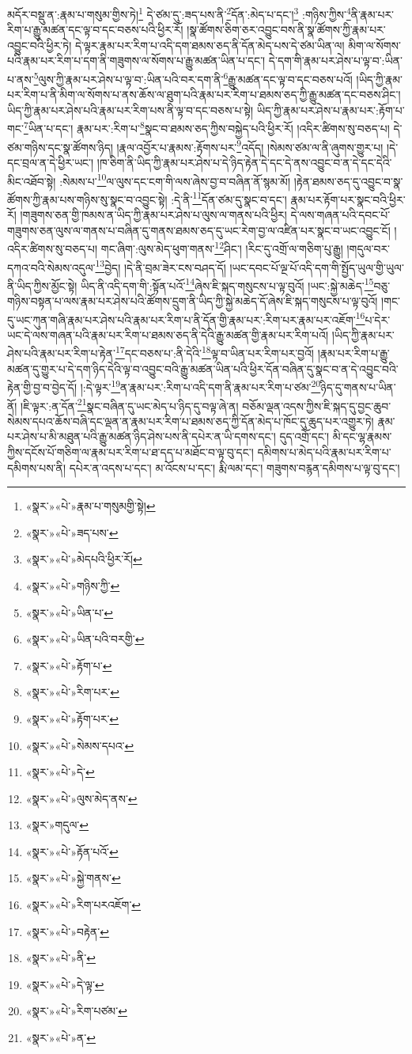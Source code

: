མདོར་བསྡུ་ན་:རྣམ་པ་གསུམ་གྱིས་ཏེ།\footnote{«སྣར་»«པེ་»རྣམ་པ་གསུམགྱི་སྟེ།} དེ་ཙམ་དུ་:ཟད་པས་ནི་\footnote{«སྣར་»«པེ་»ཟད་པས་}དོན་:མེད་པ་དང་།\footnote{«སྣར་»«པེ་»མེདཔའི་ཕྱིར་རོ།} :གཉིས་ཀྱིས་\footnote{«སྣར་»«པེ་»གཉིས་ཀྱི་}ནི་རྣམ་པར་རིག་པ་རྒྱུ་མཚན་དང་ལྟ་བ་དང་བཅས་པའི་ཕྱིར་རོ། །སྣ་ཚོགས་ཅིག་ཅར་འབྱུང་བས་ནི་སྣ་ཚོགས་ཀྱི་རྣམ་པར་འབྱུང་བའི་ཕྱིར་ཏེ། དེ་ལྟར་རྣམ་པར་རིག་པ་འདི་དག་ཐམས་ཅད་ནི་དོན་མེད་པས་དེ་ཙམ་ཡིན་ལ། མིག་ལ་སོགས་པའི་རྣམ་པར་རིག་པ་དག་ནི་གཟུགས་ལ་སོགས་པ་རྒྱུ་མཚན་ཡིན་པ་དང་། དེ་དག་གི་རྣམ་པར་ཤེས་པ་ལྟ་བ་:ཡིན་པ་ནས་\footnote{«སྣར་»«པེ་»ཡིན་པ་}ལུས་ཀྱི་རྣམ་པར་ཤེས་པ་ལྟ་བ་:ཡིན་པའི་བར་དག་ནི་\footnote{«སྣར་»«པེ་»ཡིན་པའི་བརགྱི་}རྒྱུ་མཚན་དང་ལྟ་བ་དང་བཅས་པའོ། །ཡིད་ཀྱི་རྣམ་པར་རིག་པ་ནི་མིག་ལ་སོགས་པ་ནས་ཆོས་ལ་ཐུག་པའི་རྣམ་པར་རིག་པ་ཐམས་ཅད་ཀྱི་རྒྱུ་མཚན་དང་བཅས་ཤིང་། ཡིད་ཀྱི་རྣམ་པར་ཤེས་པའི་རྣམ་པར་རིག་པས་ནི་ལྟ་བ་དང་བཅས་པ་སྟེ། ཡིད་ཀྱི་རྣམ་པར་ཤེས་པ་རྣམ་པར་:རྟོག་པ་གང་\footnote{«སྣར་»«པེ་»རྟོག་པ་}ཡིན་པ་དང་། རྣམ་པར་:རིག་པ་\footnote{«སྣར་»«པེ་»རིག་པར་}སྣང་བ་ཐམས་ཅད་ཀྱིས་བསྐྱེད་པའི་ཕྱིར་རོ། །འདིར་ཚིགས་སུ་བཅད་པ། དེ་ཙམ་གཉིས་དང་སྣ་ཚོགས་ཉིད། །རྣལ་འབྱོར་པ་རྣམས་:རྟོགས་པར་\footnote{«སྣར་»«པེ་»རྟོག་པར་}འདོད། །སེམས་ཙམ་ལ་ནི་ཞུགས་གྱུར་པ། །དེ་དང་བྲལ་ན་དེ་ཕྱིར་ཡང་། །ཁ་ཅིག་ནི་ཡིད་ཀྱི་རྣམ་པར་ཤེས་པ་དེ་ཉིད་རྟེན་དེ་དང་དེ་ནས་འབྱུང་བ་ན་དེ་དང་དེའི་མིང་འཐོབ་སྟེ། :སེམས་པ་\footnote{«སྣར་»«པེ་»སེམས་དཔའ་}ལ་ལུས་དང་ངག་གི་ལས་ཞེས་བྱ་བ་བཞིན་ནོ་སྙམ་མོ། །རྟེན་ཐམས་ཅད་དུ་འབྱུང་བ་སྣ་ཚོགས་ཀྱི་རྣམ་པས་གཉིས་སུ་སྣང་བ་འབྱུང་སྟེ། :དེ་ནི་\footnote{«སྣར་»«པེ་»དེ་}དོན་ཙམ་དུ་སྣང་བ་དང་། རྣམ་པར་རྟོག་པར་སྣང་བའི་ཕྱིར་རོ། །གཟུགས་ཅན་གྱི་ཁམས་ན་ཡིད་ཀྱི་རྣམ་པར་ཤེས་པ་ལུས་ལ་གནས་པའི་ཕྱིར། དེ་ལས་གཞན་པའི་དབང་པོ་གཟུགས་ཅན་ལུས་ལ་གནས་པ་བཞིན་དུ་གནས་ཐམས་ཅད་དུ་ཡང་རེག་བྱ་ལ་འཛིན་པར་སྣང་བ་ཡང་འབྱུང་ངོ། །འདིར་ཚིགས་སུ་བཅད་པ། གང་ཞིག་:ལུས་མེད་ཕུག་གནས་\footnote{«སྣར་»«པེ་»ལུས་མེད་ནས་}ཤིང་། །རིང་དུ་འགྲོ་ལ་གཅིག་པུ་རྒྱུ། །གདུལ་བར་དཀའ་བའི་སེམས་འདུལ་\footnote{«སྣར་»གདུལ་}བྱེད། །དེ་ནི་བྲམ་ཟེར་ངས་བཤད་དོ། །ཡང་དབང་པོ་ལྔ་པོ་འདི་དག་གི་སྤྱོད་ཡུལ་གྱི་ཡུལ་ནི་ཡིད་ཀྱིས་མྱོང་སྟེ། ཡིད་ནི་འདི་དག་གི་:སྟོན་པའོ་\footnote{«སྣར་»«པེ་»རྟོན་པའོ་}ཞེས་ཇི་སྐད་གསུངས་པ་ལྟ་བུའོ། །ཡང་:སྐྱེ་མཆེད་\footnote{«སྣར་»«པེ་»སྐྱེ་གནས་}བཅུ་གཉིས་བསྟན་པ་ལས་རྣམ་པར་ཤེས་པའི་ཚོགས་དྲུག་ནི་ཡིད་ཀྱི་སྐྱེ་མཆེད་དོ་ཞེས་ཇི་སྐད་གསུངས་པ་ལྟ་བུའོ། །གང་དུ་ཡང་ཀུན་གཞི་རྣམ་པར་ཤེས་པའི་རྣམ་པར་རིག་པ་ནི་དོན་གྱི་རྣམ་པར་:རིག་པར་རྣམ་པར་འཇོག་\footnote{«སྣར་»«པེ་»རིག་པརའཇོག་}པ་དེར་ཡང་དེ་ལས་གཞན་པའི་རྣམ་པར་རིག་པ་ཐམས་ཅད་ནི་དེའི་རྒྱུ་མཚན་གྱི་རྣམ་པར་རིག་པའོ། །ཡིད་ཀྱི་རྣམ་པར་ཤེས་པའི་རྣམ་པར་རིག་པ་རྟེན་\footnote{«སྣར་»«པེ་»བརྟེན་}དང་བཅས་པ་:ནི་དེའི་\footnote{«སྣར་»«པེ་»ནི་}ལྟ་བ་ཡིན་པར་རིག་པར་བྱའོ། །རྣམ་པར་རིག་པ་རྒྱུ་མཚན་དུ་གྱུར་པ་དེ་དག་ཉིད་དེའི་ལྟ་བ་འབྱུང་བའི་རྒྱུ་མཚན་ཡིན་པའི་ཕྱིར་དོན་བཞིན་དུ་སྣང་བ་ན་དེ་འབྱུང་བའི་རྟེན་གྱི་བྱ་བ་བྱེད་དོ། །:དེ་ལྟར་\footnote{«སྣར་»«པེ་»དེ་ལྟ་}ན་རྣམ་པར་:རིག་པ་འདི་དག་ནི་རྣམ་པར་རིག་པ་ཙམ་\footnote{«སྣར་»«པེ་»རིག་པཙམ་}ཉིད་དུ་གནས་པ་ཡིན་ནོ། །ཇི་ལྟར་:ན་དོན་\footnote{«སྣར་»«པེ་»ན་}སྣང་བཞིན་དུ་ཡང་མེད་པ་ཉིད་དུ་བལྟ་ཞེ་ན། བཅོམ་ལྡན་འདས་ཀྱིས་ཇི་སྐད་དུ་བྱང་ཆུབ་སེམས་དཔའ་ཆོས་བཞི་དང་ལྡན་ན་རྣམ་པར་རིག་པ་ཐམས་ཅད་ཀྱི་དོན་མེད་པ་ཁོང་དུ་ཆུད་པར་འགྱུར་ཏེ། རྣམ་པར་ཤེས་པ་མི་མཐུན་པའི་རྒྱུ་མཚན་ཉིད་ཤེས་པས་ནི་དཔེར་ན་ཡི་དགས་དང་། དུད་འགྲོ་དང་། མི་དང་ལྷ་རྣམས་ཀྱིས་དངོས་པོ་གཅིག་ལ་རྣམ་པར་རིག་པ་ཐ་དད་པ་མཐོང་བ་ལྟ་བུ་དང་། དམིགས་པ་མེད་པའི་རྣམ་པར་རིག་པ་དམིགས་པས་ནི། དཔེར་ན་འདས་པ་དང་། མ་འོངས་པ་དང་། རྨི་ལམ་དང་། གཟུགས་བརྙན་དམིགས་པ་ལྟ་བུ་དང་། 